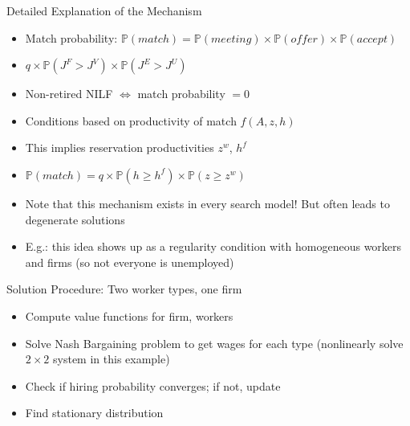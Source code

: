 \documentclass[lualatex]{beamer}
\begin{document}
\begin{frame}{Detailed Explanation of the Mechanism}
\begin{itemize}

	\item Match probability: $\mathbb{P}(match) = \mathbb{P}\left(meeting\right)
	\times \mathbb{P}\left(offer\right) \times \mathbb{P}\left(accept\right)$

	\item $q \times \mathbb{P}\left(J^F > J^V\right) \times \mathbb{P}\left(J^E > J^U\right)$

	\item Non-retired NILF $\iff$ match probability $=0$

	\pause

	\item Conditions based on productivity of match $f(A, z, h)$

	\item This implies reservation productivities $z^w$, $h^f$

	\item $\mathbb{P}\left(match\right) = q \times \mathbb{P}\left(h \geq h^f\right) \times \mathbb{P}\left(z \geq z^w\right)$

	\pause

	\item Note that this mechanism exists in every search model! But often leads to degenerate solutions

	\item E.g.: this idea shows up as a regularity condition with homogeneous workers and firms (so not everyone is unemployed)
\end{itemize}
\end{frame}

\begin{frame}{Solution Procedure: Two worker types, one firm}
\begin{itemize}

	\item Compute value functions for firm, workers

	\item Solve Nash Bargaining problem to get wages for each type (nonlinearly solve $2 \times 2$ system in this example)

	\item Check if hiring probability converges; if not, update

	\item Find stationary distribution

\end{itemize}
\end{frame}
\end{document}
